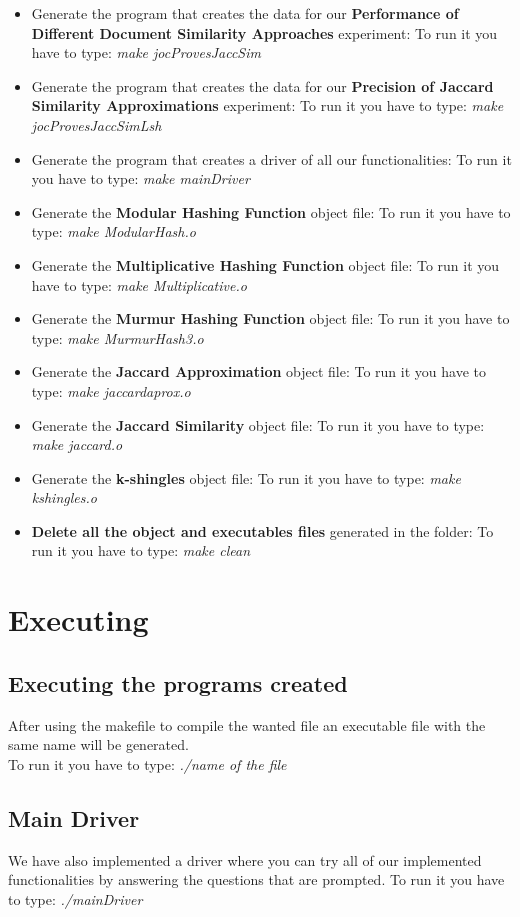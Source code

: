 \documentclass[12pt]{article}
\begin{document}
\begin{itemize}
\item Generate the program that creates the data for our \textbf{Performance of Different Document Similarity Approaches} experiment:
   To run it you have to type: \textit{make jocProvesJaccSim}
   \item Generate the program that creates the data for our \textbf{Precision of Jaccard Similarity Approximations} experiment:
   To run it you have to type: \textit{make jocProvesJaccSimLsh}
   \item Generate the program that creates a driver of all our functionalities:
   To run it you have to type: \textit{make mainDriver}
   \item Generate the \textbf{Modular Hashing Function} object file:
   To run it you have to type: \textit{make ModularHash.o} 
   \item Generate the \textbf{Multiplicative Hashing Function} object file:
   To run it you have to type: \textit{make Multiplicative.o}
   \item Generate the \textbf{Murmur Hashing Function} object file:
   To run it you have to type: \textit{make MurmurHash3.o}
   \item Generate the \textbf{Jaccard Approximation} object file:
   To run it you have to type: \textit{make jaccardaprox.o}
   \item Generate the \textbf{Jaccard Similarity} object file:
   To run it you have to type: \textit{make jaccard.o}
   \item Generate the \textbf{k-shingles} object file:
   To run it you have to type: \textit{make kshingles.o}
   \item \textbf{Delete all the object and executables files} generated in the folder:
   To run it you have to type: \textit{make clean}
   \end{itemize}
      \section{Executing}
         \subsection{Executing the programs created}
         After using the makefile to compile the wanted file an executable file with the same name will be generated.\\
         To run it you have to type:  \textit{./name of the file}
   \subsection{Main Driver}
   We have also implemented a driver where you can try all of our implemented functionalities by answering the questions that are prompted.
   To run it you have to type:  \textit{./mainDriver}

   
   
\end{document}
